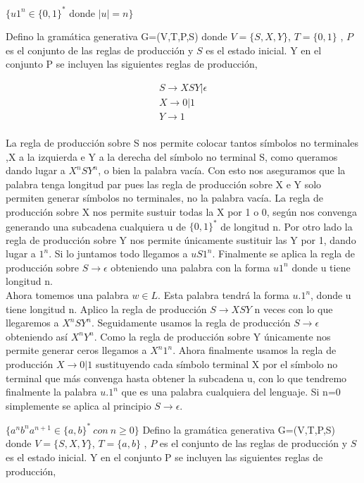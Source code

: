 \documentclass[a4paper,11pt]{article}
\begin{document}
$\{u1^n \in \{0,1\}^*$ donde $|u| = n\}$

Defino la gramática generativa G=(V,T,P,S) donde $V=\{S,X,Y\}$, $T=\{0,1\}$ , $P$ es el conjunto de las reglas de producción y $S$ es el estado inicial. Y en el conjunto P se incluyen las siguientes reglas de producción,

\begin{align*}
S \rightarrow XSY|\epsilon  \\
X \rightarrow 0|1 \\
Y \rightarrow 1 \\
\end{align*}

La regla de producción sobre S nos permite colocar tantos símbolos no terminales ,X a la izquierda e Y a la derecha del símbolo no terminal S, como queramos dando lugar a $X^nSY^n$, o bien la palabra vacía. Con esto nos aseguramos que la palabra tenga longitud par pues las regla de producción sobre X e Y solo permiten generar símbolos no terminales, no la palabra vacía. La regla de producción sobre X nos permite sustuir todas la X por 1 o 0, según nos convenga generando una subcadena cualquiera u de $\{0,1\}^*$ de longitud n. Por otro lado la regla de producción sobre Y nos permite únicamente sustituir las Y por 1, dando lugar a $1^n$. Si lo juntamos todo llegamos a $uS1^n$. Finalmente se aplica la regla de producción sobre $S \rightarrow \epsilon$ obteniendo una palabra con la forma $u1^n$ donde u tiene longitud n. \\

Ahora tomemos una palabra $w \in L$. Esta palabra tendrá la forma $u.1^n$, donde u tiene longitud n. Aplico la regla de producción $S \rightarrow XSY$ n veces con lo que llegaremos a $X^nSY^n$. Seguidamente usamos la regla de producción $S \rightarrow \epsilon$ obteniendo así $X^nY^n$. Como la regla de producción sobre Y únicamente nos permite generar ceros llegamos a $X^n1^n$. Ahora finalmente usamos la regla de producción $X \rightarrow 0|1$ sustituyendo cada símbolo terminal X por el símbolo no terminal que más convenga hasta obtener la subcadena u, con lo que tendremo finalmente la palabra $u.1^n$ que es una palabra cualquiera del lenguaje. Si n=0 simplemente se aplica al principio $S \rightarrow \epsilon$.

$\{a^nb^na^{n+1} \in \{a,b\}^* \> con \> n \geq 0\}$
Defino la gramática generativa G=(V,T,P,S) donde $V=\{S,X,Y\}$, $T=\{a,b\}$ , $P$ es el conjunto de las reglas de producción y $S$ es el estado inicial. Y en el conjunto P se incluyen las siguientes reglas de producción,
\end{document}
